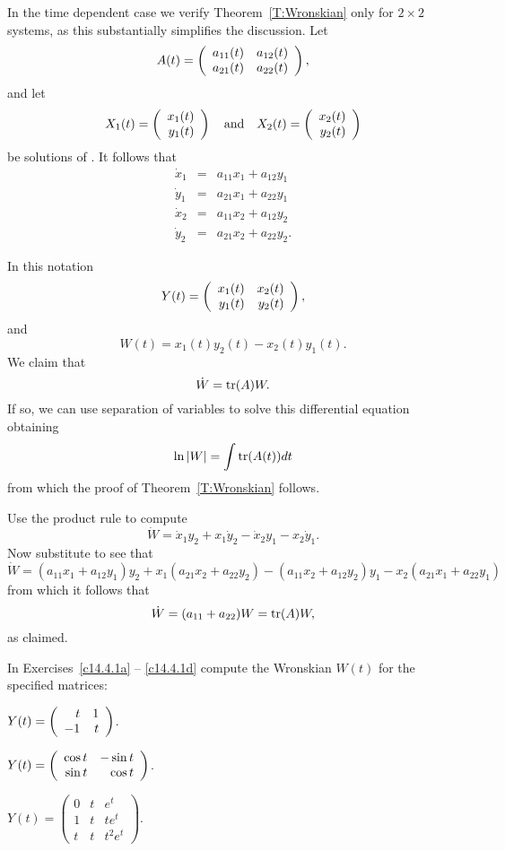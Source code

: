 \documentclass{ximera}
\begin{document}
In the time dependent case we verify Theorem~\ref{T:Wronskian} only 
for $2\times 2$ systems, as this 
substantially simplifies the discussion.   Let 
\[
A(t) = \left(\begin{array}{rr} a_{11}(t) & a_{12}(t)\\ a_{21}(t) &a_{22}(t)\end{array}\right),
\]
and let 
\[
X_1(t) = \left(\begin{array}{r} x_1(t) \\ y_1(t)\end{array}\right) \quad\mbox{and}\quad  X_2(t) = \left(\begin{array}{r} x_2(t) \\ y_2(t)\end{array}\right)
\]
be solutions of .  It follows that 
\begin{equation}   \label{E:xyderiv}
\begin{array}{rcl}
\dot{x}_1 & = & a_{11}x_1 + a_{12}y_1 \\
\dot{y}_1 & = & a_{21}x_1 + a_{22}y_1 \\
\dot{x}_2 & = & a_{11}x_2 + a_{12}y_2 \\
\dot{y}_2 & = & a_{21}x_2 + a_{22}y_2.
\end{array}
\end{equation}

In this notation 
\[
Y(t) = \left(\begin{array}{rr} x_1(t) & x_2(t)\\ y_1(t) &y_2(t)\end{array}\right),
\]
and
\[
W(t) = x_1(t)y_2(t) - x_2(t)y_1(t).
\]
We claim that 
\[
\dot{W} = {\rm tr}(A) W.
\]
If so, we can use separation of variables to solve this differential equation 
obtaining
\[
\ln |W| = \int {\rm tr}(A(t))dt 
\]
from which the proof of Theorem~\ref{T:Wronskian} follows.

Use the product rule to compute
\[
\dot{W}  =  \dot{x}_1y_2 + x_1\dot{y}_2 - \dot{x}_2y_1 - x_2\dot{y}_1.
\]
Now substitute  to see that 
\[
\dot{W} = (a_{11}x_1 + a_{12}y_1)y_2 + x_1(a_{21}x_2 + a_{22}y_2)
- (a_{11}x_2 + a_{12}y_2)y_1 - x_2(a_{21}x_1 + a_{22}y_1)
\]
from which it follows that 
\[
\dot{W} = (a_{11}+a_{22})W = {\rm tr}(A)W,
\]
as claimed.


\EXER

\TEXER

In Exercises~\ref{c14.4.1a} -- \ref{c14.4.1d} compute the Wronskian
$W(t)$ for the specified matrices:

\begin{exercise} \label{c14.4.1a}
$Y(t) = \left(\begin{array}{rr} t & 1\\ -1 &t\end{array}\right)$.
\end{exercise}

\begin{exercise} \label{c14.4.1b}
$Y(t) = \left(\begin{array}{rr} \cos t & -\sin t\\ \sin t &\cos t\end{array}\right)$.
\end{exercise}

\begin{exercise} \label{c14.4.1c}
$Y(t) = \left(\begin{array}{ccc}
0 & t & e^t\\  1 & t & te^t \\ t & t & t^2 e^t \end{array}\right)$.
\end{exercise}
\end{document}
